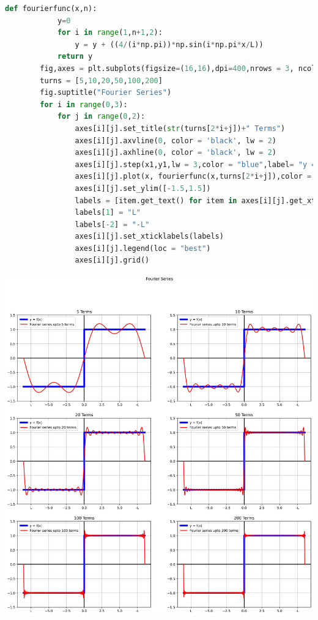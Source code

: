 \documentclass[addpoints]{exam}
\begin{document}
\begin{questions}
\begin{solution}
\begin{lstlisting}[language = python]
        def fourierfunc(x,n):
            y=0
            for i in range(1,n+1,2):
                y = y + ((4/(i*np.pi))*np.sin(i*np.pi*x/L))
            return y
        fig,axes = plt.subplots(figsize=(16,16),dpi=400,nrows = 3, ncols = 2)
        turns = [5,10,20,50,100,200]
        fig.suptitle("Fourier Series")
        for i in range(0,3):
            for j in range(0,2):
                axes[i][j].set_title(str(turns[2*i+j])+" Terms")
                axes[i][j].axvline(0, color = 'black', lw = 2)
                axes[i][j].axhline(0, color = 'black', lw = 2)
                axes[i][j].step(x1,y1,lw = 3,color = "blue",label= "y = f(x) ")
                axes[i][j].plot(x, fourierfunc(x,turns[2*i+j]),color = "red",lw =2, label = "Fourier series upto "+str(turns[2*i+j])+" terms")
                axes[i][j].set_ylim([-1.5,1.5])
                labels = [item.get_text() for item in axes[i][j].get_xticklabels()]
                labels[1] = "L"
                labels[-2] = "-L"
                axes[i][j].set_xticklabels(labels)
                axes[i][j].legend(loc = "best")
                axes[i][j].grid()
    \end{lstlisting}
     \includegraphics[width = 6.0in]{output_3_1.png}
\end{solution}

\end{questions}
\end{document}
